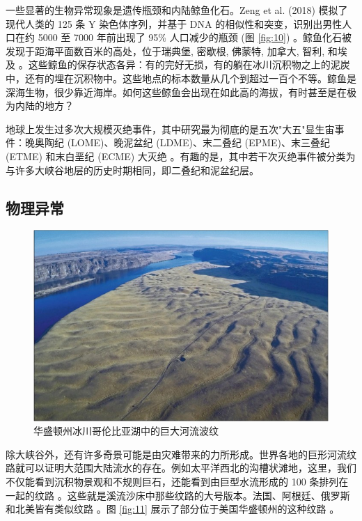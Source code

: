 \documentclass[10pt,twocolumn,letterpaper]{article}
\begin{document}
一些显著的生物异常现象是遗传瓶颈和内陆鲸鱼化石。Zeng et al. (2018) 模拟了现代人类的 125 条 Y 染色体序列，并基于 DNA 的相似性和突变，识别出男性人口在约 5000 至 7000 年前出现了 95\% 人口减少的瓶颈 (图 \ref{fig:10}) \cite{62}。鲸鱼化石被发现于距海平面数百米的高处，位于瑞典堡, 密歇根, 佛蒙特, 加拿大, 智利, 和埃及 \cite{63,64,65,66}。这些鲸鱼的保存状态各异：有的完好无损，有的躺在冰川沉积物之上的泥炭中，还有的埋在沉积物中。这些地点的标本数量从几个到超过一百个不等。鲸鱼是深海生物，很少靠近海岸。如何这些鲸鱼会出现在如此高的海拔，有时甚至是在极为内陆的地方？

地球上发生过多次大规模灭绝事件，其中研究最为彻底的是五次"大五"显生宙事件：晚奥陶纪 (LOME)、晚泥盆纪 (LDME)、末二叠纪 (EPME)、末三叠纪 (ETME) 和末白垩纪 (ECME) 大灭绝 \cite{88,89}。有趣的是，其中若干次灭绝事件被分类为与许多大峡谷地层的历史时期相同，即二叠纪和泥盆纪层。

\subsection{物理异常}

\begin{figure}[b]
\begin{center}
   \includegraphics[width=1\linewidth]{columbia.jpg}
\end{center}
   \caption{华盛顿州冰川哥伦比亚湖中的巨大河流波纹 \cite{80}}
\label{fig:11}
\label{fig:onecol}
\end{figure}

除大峡谷外，还有许多奇景可能是由灾难带来的力所形成。世界各地的巨形河流纹路就可以证明大范围大陆流水的存在。例如太平洋西北的沟槽状滩地，这里，我们不仅能看到沉积物景观和不规则巨石，还能看到由巨型水流形成的 100 条排列在一起的纹路 \cite{78,79}。这些就是溪流沙床中那些纹路的大号版本。法国、阿根廷、俄罗斯和北美皆有类似纹路 \cite{81}。图 \ref{fig:11} 展示了部分位于美国华盛顿州的这种纹路 \cite{80}。
\end{document}
